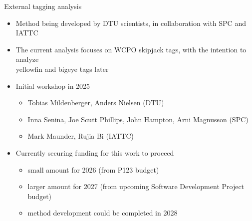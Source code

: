 \documentclass[aspectratio=169]{beamer}
\begin{document}
\begin{frame}{External tagging analysis}\small
  \begin{itemize}
    \item[] Method being developed by {\darkgreen DTU scientists}, in
    collaboration with SPC and IATTC\\[3ex]
    \item[] The current analysis focuses on WCPO skipjack tags, with the
    intention to analyze\\[0.2ex]
    yellowfin and bigeye tags later\\[3ex]
    \item[] Initial workshop in 2025
    \begin{itemize}
      \item[-] Tobias Mildenberger, Anders Nielsen (DTU)\\[0.6ex]
      \item[-] Inna Senina, Joe Scutt Phillips, John Hampton, Arni Magnusson
      (SPC)\\[0.6ex]
      \item[-] Mark Maunder, Rujia Bi (IATTC)\\[3ex]
    \end{itemize}
    \item[] Currently securing funding for this work to proceed
    \begin{itemize}
      \item[-] small amount for 2026 (from P123 budget)\\[0.6ex]
      \item[-] larger amount for 2027 (from upcoming Software Development
      Project budget)\\[0.6ex]
      \item[-] method development could be completed in 2028
      \\[3ex]
    \end{itemize}
  \end{itemize}
\end{frame}

\end{document}
